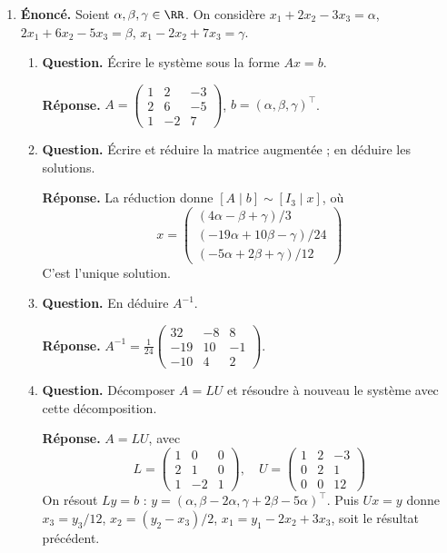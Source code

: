 \documentclass[12pt, a4paper]{article}
\begin{document}
\begin{enumerate}[label=4.\arabic*., start=60]
  \item \begin{minipage}[t]{\linewidth}\raggedright
\textbf{Énoncé.} Soient $\alpha,\beta,\gamma\in\RR$. On considère $x_1+2x_2-3x_3=\alpha$, $2x_1+6x_2-5x_3=\beta$, $x_1-2x_2+7x_3=\gamma$.

\begin{enumerate}[\arabic*.]
        \item \textbf{Question.} Écrire le système sous la forme $Ax=b$.
\par\smallskip
\textbf{Réponse.} $\displaystyle A=\begin{pmatrix}1&2&-3\\2&6&-5\\1&-2&7\end{pmatrix}$, $b=(\alpha,\beta,\gamma)^\top$.

  \item \textbf{Question.} Écrire et réduire la matrice augmentée ; en déduire les solutions.
\par\smallskip
\textbf{Réponse.} La réduction donne $[A\mid b]\sim[I_3\mid x]$, où
        \[
          x=\begin{pmatrix}(4\alpha-\beta+\gamma)/3\\(-19\alpha+10\beta-\gamma)/24\\(-5\alpha+2\beta+\gamma)/12\end{pmatrix}
        \]
        C'est l'unique solution.

  \item \textbf{Question.} En déduire $A^{-1}$.
\par\smallskip
\textbf{Réponse.} $\displaystyle A^{-1}=\frac1{24}\begin{pmatrix}32&-8&8\\-19&10&-1\\-10&4&2\end{pmatrix}$.

  \item \textbf{Question.} Décomposer $A=LU$ et résoudre à nouveau le système avec cette décomposition.
\par\smallskip
\textbf{Réponse.} $A=LU$, avec
        \[
          L=\begin{pmatrix}1&0&0\\2&1&0\\1&-2&1\end{pmatrix},\quad
          U=\begin{pmatrix}1&2&-3\\0&2&1\\0&0&12\end{pmatrix}
        \]
        On résout $Ly=b$ : $y=(\alpha,\beta-2\alpha,\gamma+2\beta-5\alpha)^\top$.
        Puis $Ux=y$ donne $x_3=y_3/12$, $x_2=(y_2-x_3)/2$, $x_1=y_1-2x_2+3x_3$, soit le résultat précédent.


\end{enumerate}
\end{minipage}
\end{enumerate}
\end{document}
